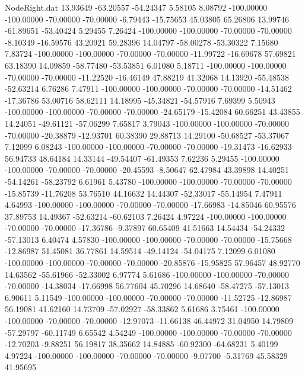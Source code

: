 \begin{filecontents}{NodeRight.dat}
  13.93649  -63.20557  -54.24347     5.58105    8.08792 -100.00000 -100.00000  -70.00000  -70.00000   -6.79443  -15.75653   45.03805   65.26806
  13.99746  -61.89651  -53.40424     5.29455    7.26424 -100.00000 -100.00000  -70.00000  -70.00000   -8.10349  -16.59576   43.20921   59.28396
  14.04797  -58.00278  -53.30322     7.15680    7.83724 -100.00000 -100.00000  -70.00000  -70.00000  -11.99722  -16.69678   57.69821   63.18390
  14.09859  -58.77480  -53.53851     6.01080    5.18711 -100.00000 -100.00000  -70.00000  -70.00000  -11.22520  -16.46149   47.88219   41.32068
  14.13920  -55.48538  -52.63214     6.76286    7.47911 -100.00000 -100.00000  -70.00000  -70.00000  -14.51462  -17.36786   53.00716   58.62111
  14.18995  -45.34821  -54.57916     7.69399    5.50943 -100.00000 -100.00000  -70.00000  -70.00000  -24.65179  -15.42084   60.66251   43.43855
  14.24051  -49.61121  -57.06299     7.65817    3.79043 -100.00000 -100.00000  -70.00000  -70.00000  -20.38879  -12.93701   60.38390   29.88713
  14.29100  -50.68527  -53.37067     7.12099    6.08243 -100.00000 -100.00000  -70.00000  -70.00000  -19.31473  -16.62933   56.94733   48.64184
  14.33144  -49.54407  -61.49353     7.62236    5.29455 -100.00000 -100.00000  -70.00000  -70.00000  -20.45593   -8.50647   62.47984   43.39898
  14.40251  -54.14261  -58.23792     6.61961    5.43780 -100.00000 -100.00000  -70.00000  -70.00000  -15.85739  -11.76208   53.76510   44.16632
  14.44307  -52.33017  -55.14954     7.47911    4.64993 -100.00000 -100.00000  -70.00000  -70.00000  -17.66983  -14.85046   60.95576   37.89753
  14.49367  -52.63214  -60.62103     7.26424    4.97224 -100.00000 -100.00000  -70.00000  -70.00000  -17.36786   -9.37897   60.65409   41.51663
  14.54434  -54.24332  -57.13013     6.40474    4.57830 -100.00000 -100.00000  -70.00000  -70.00000  -15.75668  -12.86987   51.45081   36.77861
  14.59514  -49.14124  -54.04175     7.12099    6.01080 -100.00000 -100.00000  -70.00000  -70.00000  -20.85876  -15.95825   57.96457   48.92770
  14.63562  -55.61966  -52.33002     6.97774    5.61686 -100.00000 -100.00000  -70.00000  -70.00000  -14.38034  -17.66998   56.77604   45.70296
  14.68640  -58.47275  -57.13013     6.90611    5.11549 -100.00000 -100.00000  -70.00000  -70.00000  -11.52725  -12.86987   56.19081   41.62160
  14.73709  -57.02927  -58.33862     5.61686    3.75461 -100.00000 -100.00000  -70.00000  -70.00000  -12.97073  -11.66138   46.44972   31.04950
  14.79809  -57.29797  -60.11749     6.65542    4.54249 -100.00000 -100.00000  -70.00000  -70.00000  -12.70203   -9.88251   56.19817   38.35662
  14.84885  -60.92300  -64.68231     5.40199    4.97224 -100.00000 -100.00000  -70.00000  -70.00000   -9.07700   -5.31769   45.58329   41.95695

\end{filecontents}
